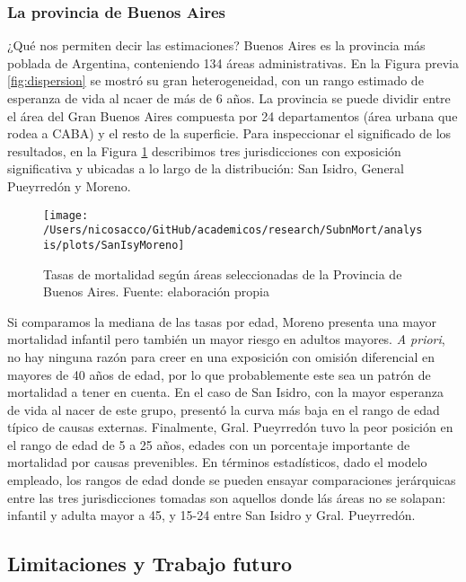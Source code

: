 \documentclass[12pt,]{article}
\begin{document}
\hypertarget{la-provincia-de-buenos-aires}{%
\subsubsection{La provincia de Buenos
Aires}\label{la-provincia-de-buenos-aires}}

¿Qué nos permiten decir las estimaciones? Buenos Aires es la provincia
más poblada de Argentina, conteniendo 134 áreas administrativas. En la
Figura previa \ref{fig:dispersion} se mostró su gran heterogeneidad, con
un rango estimado de esperanza de vida al ncaer de más de 6 años. La
provincia se puede dividir entre el área del Gran Buenos Aires compuesta
por 24 departamentos (área urbana que rodea a CABA) y el resto de la
superficie. Para inspeccionar el significado de los resultados, en la
Figura \ref{fig:dptosBsAs} describimos tres jurisdicciones con
exposición significativa y ubicadas a lo largo de la distribución: San
Isidro, General Pueyrredón y Moreno.

\begin{figure}

{\centering \texttt{[image: /Users/nicosacco/GitHub/academicos/research/SubnMort/analysis/plots/SanIsyMoreno]} 

}

\caption{Tasas de mortalidad según áreas seleccionadas de la Provincia de Buenos Aires. Fuente: elaboración propia}\label{fig:dptosBsAs}
\end{figure}

Si comparamos la mediana de las tasas por edad, Moreno presenta una
mayor mortalidad infantil pero también un mayor riesgo en adultos
mayores. \emph{A priori}, no hay ninguna razón para creer en una
exposición con omisión diferencial en mayores de 40 años de edad, por lo
que probablemente este sea un patrón de mortalidad a tener en cuenta. En
el caso de San Isidro, con la mayor esperanza de vida al nacer de este
grupo, presentó la curva más baja en el rango de edad típico de causas
externas. Finalmente, Gral. Pueyrredón tuvo la peor posición en el rango
de edad de 5 a 25 años, edades con un porcentaje importante de
mortalidad por causas prevenibles. En términos estadísticos, dado el
modelo empleado, los rangos de edad donde se pueden ensayar
comparaciones jerárquicas entre las tres jurisdicciones tomadas son
aquellos donde lás áreas no se solapan: infantil y adulta mayor a 45, y
15-24 entre San Isidro y Gral. Pueyrredón.

\hypertarget{limitaciones-y-trabajo-futuro}{%
\subsection{Limitaciones y Trabajo
futuro}\label{limitaciones-y-trabajo-futuro}}
\end{document}
